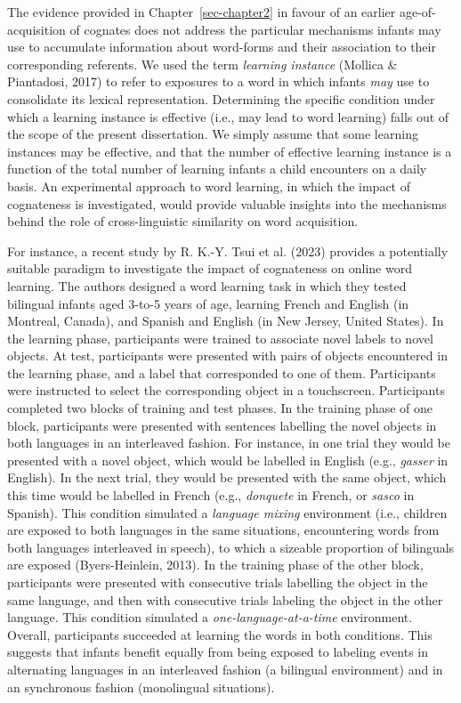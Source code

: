 \documentclass[
  12pt,
  b5paperpaper,
  twoside]{scrreprt}
\begin{document}
The evidence provided in Chapter~\ref{sec-chapter2} in favour of an
earlier age-of-acquisition of cognates does not address the particular
mechanisms infants may use to accumulate information about word-forms
and their association to their corresponding referents. We used the term
\emph{learning instance} (Mollica \& Piantadosi, 2017) to refer to
exposures to a word in which infants \emph{may} use to consolidate its
lexical representation. Determining the specific condition under which a
learning instance is effective (i.e., may lead to word learning) falls
out of the scope of the present dissertation. We simply assume that some
learning instances may be effective, and that the number of effective
learning instance is a function of the total number of learning infants
a child encounters on a daily basis. An experimental approach to word
learning, in which the impact of cognateness is investigated, would
provide valuable insights into the mechanisms behind the role of
cross-linguistic similarity on word acquisition.

For instance, a recent study by R. K.-Y. Tsui et al. (2023) provides a
potentially suitable paradigm to investigate the impact of cognateness
on online word learning. The authors designed a word learning task in
which they tested bilingual infants aged 3-to-5 years of age, learning
French and English (in Montreal, Canada), and Spanish and English (in
New Jersey, United States). In the learning phase, participants were
trained to associate novel labels to novel objects. At test,
participants were presented with pairs of objects encountered in the
learning phase, and a label that corresponded to one of them.
Participants were instructed to select the corresponding object in a
touchscreen. Participants completed two blocks of training and test
phases. In the training phase of one block, participants were presented
with sentences labelling the novel objects in both languages in an
interleaved fashion. For instance, in one trial they would be presented
with a novel object, which would be labelled in English (e.g.,
\emph{gasser} in English). In the next trial, they would be presented
with the same object, which this time would be labelled in French (e.g.,
\emph{donquete} in French, or \emph{sasco} in Spanish). This condition
simulated a \emph{language mixing} environment (i.e., children are
exposed to both languages in the same situations, encountering words
from both languages interleaved in speech), to which a sizeable
proportion of bilinguals are exposed (Byers-Heinlein, 2013). In the
training phase of the other block, participants were presented with
consecutive trials labelling the object in the same language, and then
with consecutive trials labeling the object in the other language. This
condition simulated a \emph{one-language-at-a-time} environment.
Overall, participants succeeded at learning the words in both
conditions. This suggests that infants benefit equally from being
exposed to labeling events in alternating languages in an interleaved
fashion (a bilingual environment) and in an synchronous fashion
(monolingual situations).
\end{document}
